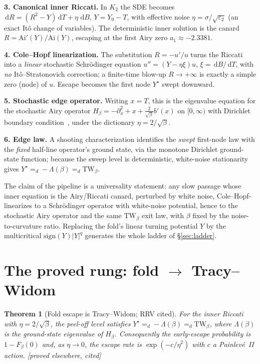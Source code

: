 \documentclass[11pt,reqno]{amsart}
\theoremstyle{plain}
\newtheorem{theorem}{Theorem}
\theoremstyle{definition}
\theoremstyle{remark}
\newcommand{\dd}{\,\mathrm{d}}
\newcommand{\Ai}{\mathrm{Ai}}
\newcommand{\TW}{\mathrm{TW}}
\newcommand{\eps}{\varepsilon}
\newcommand{\Ynode}{Y^\star}
\newcommand{\tagP}{{\footnotesize\textsf{[proved elsewhere, cited]}}}
\begin{document}
\smallskip
\noindent\textbf{3. Canonical inner Riccati.} In $K_2$ the SDE becomes
$\dd R=(R^2-Y)\dd T+\eta\,\dd B$, $Y=Y_0-T$, with effective noise $\eta=\sigma/\sqrt{\eps_2}$ (an
exact It\^o change of variables). The deterministic inner solution is the canard
$R=\Ai'(Y)/\Ai(Y)$, escaping at the first Airy zero $a_1\approx-2.3381$.

\smallskip
\noindent\textbf{4. Cole--Hopf linearization.} The substitution $R=-u'/u$ turns the Riccati into a
\emph{linear} stochastic Schr\"odinger equation $u''=(Y-\eta\xi)u$, $\xi=\dd B/\dd T$, with
\emph{no} It\^o--Stratonovich correction; a finite-time blow-up $R\to+\infty$ is exactly a simple
zero (node) of $u$. Escape becomes the first node $\Ynode$ swept downward.

\smallskip
\noindent\textbf{5. Stochastic edge operator.} Writing $x=T$, this is the eigenvalue equation for
the stochastic Airy operator $H_\beta=-\partial_x^2+x+\tfrac{2}{\sqrt\beta}b'(x)$ on $[0,\infty)$
with Dirichlet boundary condition~\cite{RRV}, under the dictionary $\eta=2/\sqrt\beta$.

\smallskip
\noindent\textbf{6. Edge law.} A shooting characterization identifies the \emph{swept} first-node
law with the \emph{fixed} half-line operator's ground state, via the monotone Dirichlet
ground-state function; because the sweep level is deterministic, white-noise stationarity gives
$\Ynode=_d-\Lambda(\beta)=_d\TW_\beta$.

\smallskip
The claim of the pipeline is a universality statement: any slow passage whose inner equation is
the Airy/Riccati canard, perturbed by white noise, Cole--Hopf-linearizes to a Schr\"odinger
operator with white-noise potential, hence to the stochastic Airy operator and the same $\TW_\beta$
exit law, with $\beta$ fixed by the noise-to-curvature ratio. Replacing the fold's linear turning
potential $Y$ by the multicritical $\mathrm{sign}(Y)|Y|^q$ generates the whole ladder of
\S\ref{sec:ladder}.

\section{The proved rung: fold $\to$ Tracy--Widom}\label{sec:fold}

\begin{theorem}[Fold escape is Tracy--Widom; RRV cited]\label{thm:fold}
For the inner Riccati with $\eta=2/\sqrt\beta$, the peel-off level satisfies
$\Ynode=_d-\Lambda(\beta)=_d\TW_\beta$, where $\Lambda(\beta)$ is the ground-state eigenvalue of
$H_\beta$. Consequently the early-escape probability is $1-F_\beta(0)$ and, as $\eta\to0$, the
escape rate is $\exp(-c/\eta^2)$ with $c$ a Painlev\'e~II action. \tagP
\end{theorem}
\end{document}
